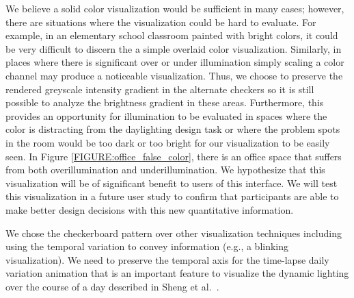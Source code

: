 \documentclass[10pt,twocolumn,letterpaper]{article}
\begin{document}
%
%
%



We believe a solid color visualization would be sufficient in many
cases; however, there are situations where the visualization could be
hard to evaluate.  For example, in an elementary school classroom 
painted with bright colors, it could be very difficult to discern
the a simple overlaid color visualization.
Similarly, in places where there is significant over or under
illumination simply scaling a color channel may 
produce a noticeable visualization.  
%
%
%
Thus, we choose to preserve the rendered greyscale intensity gradient
in the alternate checkers so it is still possible to analyze the
brightness gradient
in these 
areas.
%
Furthermore, this provides an opportunity for illumination to be
evaluated in spaces where the color is distracting from the
daylighting design task or where the problem spots in the room would
be too dark or too bright for our visualization to be easily seen.  In
Figure \ref{FIGURE:office_false_color}, there is an office space that
suffers from both overillumination and underillumination.  We hypothesize
that this 
visualization will be of significant benefit to users of this interface.
We will test this visualization 
in a future user study to confirm that participants are able to make
better design decisions with this new quantitative information.

We chose the checkerboard pattern over other visualization techniques
including using the temporal variation to convey information (e.g., a
blinking visualization).  
We need to preserve the temporal axis for the time-lapse daily
variation animation that is an important feature
to visualize 
the dynamic lighting over the course of a day described in Sheng et
al.~\cite{ShengYYC09, sheng_TVCG}.
\end{document}
